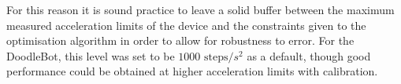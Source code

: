 For this reason it is sound practice to leave a solid buffer between the maximum measured acceleration limits of the device and the constraints given to the optimisation algorithm in order to allow for robustness to error. For the DoodleBot, this level was set to be $1000\text{ steps}/s^2$ as a default, though good performance could be obtained at higher acceleration limits with calibration.
